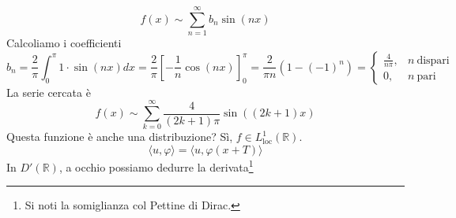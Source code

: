 \Soluzione
\begin{equation*}
f( x) \sim \sum\limits ^{\infty }_{n=1} b_{n}\sin( nx)
\end{equation*}
Calcoliamo i coefficienti
\begin{equation*}
b_{n} =\frac{2}{\pi }\int ^{\pi }_{0} 1\cdotp \sin( nx) dx=\frac{2}{\pi }\left[ -\frac{1}{n}\cos( nx)\right]^{\pi }_{0} =\frac{2}{\pi n}\left( 1-( -1)^{n}\right) =\begin{cases}
\frac{4}{n\pi } , & n\ \text{dispari}\\
0, & n\ \text{pari}
\end{cases}
\end{equation*}
La serie cercata è
\begin{equation*}
f( x) \sim \sum\limits ^{\infty }_{k=0}\frac{4}{( 2k+1) \pi }\sin(( 2k+1) x)
\end{equation*}
Questa funzione è anche una distribuzione? Sì, $f\in L^{1}_{\mathrm{loc}}(\mathbb{R})$.
\begin{equation*}
\langle u,\varphi \rangle =\langle u,\varphi ( x+T) \rangle 
\end{equation*}
In $D'(\mathbb{R})$, a occhio possiamo dedurre la derivata\footnote{Si noti la somiglianza col Pettine di Dirac.}


